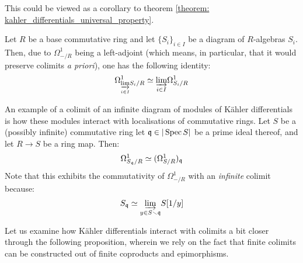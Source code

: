             \begin{remark} \label{remark: differentials_and_colimits}
                This could be viewed as a corollary to theorem \ref{theorem: kahler_differentials_universal_property}. 
                
                Let $R$ be a base commutative ring and let $\{S_i\}_{i \in I}$ be a diagram of $R$-algebras $S_i$. Then, due to $\Omega^1_{-/R}$ being a left-adjoint (which means, in particular, that it would preserve colimits \textit{a priori}), one has the following identity:
                    $$\Omega^1_{\underset{i \in I}{\varinjlim} S_i/R} \simeq \underset{i \in I}{\varinjlim} \Omega^1_{S_i/R}$$
            \end{remark}
            \begin{example} \label{example: differentials_and_localisations}
                An example of a colimit of an infinite diagram of modules of K\"ahler differentials is how these modules interact with localisations of commutative rings. Let $S$ be a (possibly infinite) commutative ring let $\mathfrak{q} \in |\operatorname{Spec} S|$ be a prime ideal thereof, and let $R \to S$ be a ring map. Then:
                    $$\Omega^1_{S_{\mathfrak{q}}/R} \simeq (\Omega^1_{S/R})_{\mathfrak{q}}$$
                Note that this exhibits the commutativity of $\Omega^1_{-/R}$ with an \textit{infinite} colimit because:
                    $$S_{\mathfrak{q}} \simeq \underset{y \in S \smallsetminus \mathfrak{q}}{\varinjlim} S[1/y]$$
            \end{example}
            Let us examine how K\"ahler differentials interact with colimits a bit closer through the following proposition, wherein we rely on the fact that finite colimits can be constructed out of finite coproducts and epimorphisms.

